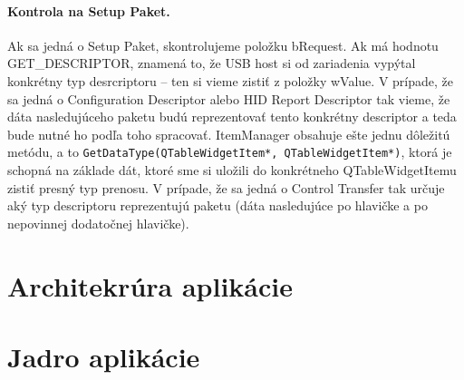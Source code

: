 \paragraph{Kontrola na Setup Paket.}
\hfill \break
Ak sa jedná o Setup Paket, skontrolujeme položku bRequest. Ak má hodnotu GET\_DESCRIPTOR, znamená to, že USB host si od zariadenia vypýtal konkrétny typ desrcriptoru -- ten si vieme zistiť z položky wValue. V prípade, že sa jedná o Configuration Descriptor alebo HID Report Descriptor tak vieme, že dáta nasledujúceho paketu budú reprezentovať tento konkrétny descriptor a teda bude nutné ho podľa toho spracovať.
\hfill \break \newline
ItemManager obsahuje ešte jednu dôležitú metódu, a to \texttt{GetDataType(QTableWidgetItem*, QTableWidgetItem*)}, ktorá je schopná na základe dát, ktoré sme si uložili do konkrétneho QTableWidgetItemu zistiť presný typ prenosu. V prípade, že sa jedná o Control Transfer tak určuje aký typ descriptoru reprezentujú  paketu (dáta nasledujúce po hlavičke a po nepovinnej dodatočnej hlavičke).




























\newpage
\section{Architekrúra aplikácie}
\section{Jadro aplikácie}
